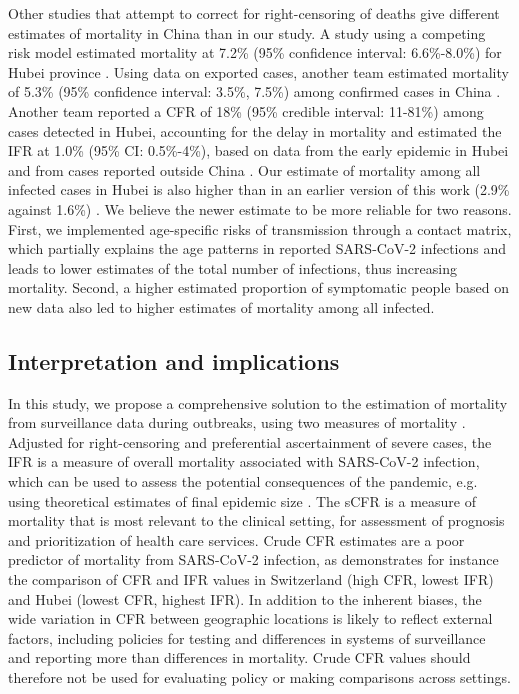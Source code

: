 \documentclass{article}
\begin{document}
Other studies that attempt to correct for right-censoring of deaths give different estimates of mortality in China than in our study. 
A study using a competing risk model estimated mortality at 7.2\% (95\% confidence interval: 6.6\%-8.0\%) for Hubei province \cite{wang2020estimating}. 
Using data on exported cases, another team estimated mortality of 5.3\% (95\% confidence interval: 3.5\%, 7.5\%) among confirmed cases in China \cite{jung2020real}. 
Another team reported a CFR of 18\% (95\% credible interval: 11-81\%) among cases detected in Hubei, accounting for the delay in mortality and estimated the IFR at 1.0\% (95\% CI: 0.5\%-4\%), based on data from the early epidemic in Hubei and from cases reported outside China \cite{Dorigatti}. 
Our estimate of mortality among all infected cases in Hubei is also higher than in an earlier version of this work (2.9\% against 1.6\%) \cite{riou2020adjusted}. 
We believe the newer estimate to be more reliable for two reasons. 
First, we implemented age-specific risks of transmission through a contact matrix, which partially explains the age patterns in reported SARS-CoV-2 infections and leads to lower estimates of the total number of infections, thus increasing mortality. 
Second, a higher estimated proportion of symptomatic people based on new data also led to higher estimates of mortality among all infected.


\subsection*{Interpretation and implications} 

In this study, we propose a comprehensive solution to the estimation of mortality from surveillance data during outbreaks, using two measures of mortality \cite{Lipsitch2015}. 
Adjusted for right-censoring and preferential ascertainment of severe cases, the IFR is a measure of overall mortality associated with SARS-CoV-2 infection, which can be used to assess the potential consequences of the pandemic, e.g. using theoretical estimates of final epidemic size \cite{hethcote2000mathematics}. 
The sCFR is a measure of mortality that is most relevant to the clinical setting, for assessment of prognosis and prioritization of health care services. 
Crude CFR estimates are a poor predictor of mortality from SARS-CoV-2 infection, as demonstrates for instance the comparison of CFR and IFR values in Switzerland (high CFR, lowest IFR) and Hubei (lowest CFR, highest IFR).
In addition to the inherent biases, the wide variation in CFR between geographic locations is likely to reflect external factors, including policies for testing and differences in systems of surveillance and reporting more than differences in mortality. 
Crude CFR values should therefore not be used for evaluating policy or making comparisons across settings. 
\end{document}
